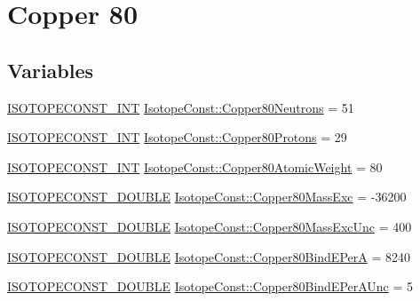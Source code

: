 \hypertarget{group___isotope_const-_copper-_cu80}{}\section{Copper 80}
\label{group___isotope_const-_copper-_cu80}
\subsection*{Variables}
\begin{DoxyCompactItemize}
\item 
\mbox{\hyperlink{group___isotope_const-_macros_ga5f18360b3e99483a35c32d789e62621c}{I\+S\+O\+T\+O\+P\+E\+C\+O\+N\+S\+T\+\_\+\+I\+NT}} \mbox{\hyperlink{group___isotope_const-_copper-_cu80_gab0d6753a676e56f24d7fbcdef13fd3b2}{Isotope\+Const\+::\+Copper80\+Neutrons}} = 51
\item 
\mbox{\hyperlink{group___isotope_const-_macros_ga5f18360b3e99483a35c32d789e62621c}{I\+S\+O\+T\+O\+P\+E\+C\+O\+N\+S\+T\+\_\+\+I\+NT}} \mbox{\hyperlink{group___isotope_const-_copper-_cu80_ga000c2fe4cc4c55c247380f85f624da36}{Isotope\+Const\+::\+Copper80\+Protons}} = 29
\item 
\mbox{\hyperlink{group___isotope_const-_macros_ga5f18360b3e99483a35c32d789e62621c}{I\+S\+O\+T\+O\+P\+E\+C\+O\+N\+S\+T\+\_\+\+I\+NT}} \mbox{\hyperlink{group___isotope_const-_copper-_cu80_gabd691bac52477a4f6455798f7516e889}{Isotope\+Const\+::\+Copper80\+Atomic\+Weight}} = 80
\item 
\mbox{\hyperlink{group___isotope_const-_macros_ga8f45a7272ce02c0b4c65c44636ed719a}{I\+S\+O\+T\+O\+P\+E\+C\+O\+N\+S\+T\+\_\+\+D\+O\+U\+B\+LE}} \mbox{\hyperlink{group___isotope_const-_copper-_cu80_ga5ed95d333ef901a6bcdd2a31da8341f2}{Isotope\+Const\+::\+Copper80\+Mass\+Exc}} = -\/36200
\item 
\mbox{\hyperlink{group___isotope_const-_macros_ga8f45a7272ce02c0b4c65c44636ed719a}{I\+S\+O\+T\+O\+P\+E\+C\+O\+N\+S\+T\+\_\+\+D\+O\+U\+B\+LE}} \mbox{\hyperlink{group___isotope_const-_copper-_cu80_ga444d8326a43b1687404833e807f94563}{Isotope\+Const\+::\+Copper80\+Mass\+Exc\+Unc}} = 400
\item 
\mbox{\hyperlink{group___isotope_const-_macros_ga8f45a7272ce02c0b4c65c44636ed719a}{I\+S\+O\+T\+O\+P\+E\+C\+O\+N\+S\+T\+\_\+\+D\+O\+U\+B\+LE}} \mbox{\hyperlink{group___isotope_const-_copper-_cu80_gab58ed520e9c3a1ea804e4edec1132379}{Isotope\+Const\+::\+Copper80\+Bind\+E\+PerA}} = 8240
\item 
\mbox{\hyperlink{group___isotope_const-_macros_ga8f45a7272ce02c0b4c65c44636ed719a}{I\+S\+O\+T\+O\+P\+E\+C\+O\+N\+S\+T\+\_\+\+D\+O\+U\+B\+LE}} \mbox{\hyperlink{group___isotope_const-_copper-_cu80_gab8826c8cac98529ba1f145905dd0b1dc}{Isotope\+Const\+::\+Copper80\+Bind\+E\+Per\+A\+Unc}} = 5

\end{DoxyCompactItemize}
